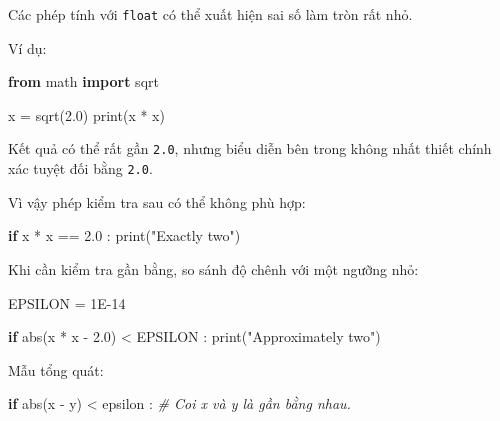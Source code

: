 \documentclass[
  11pt,
  a4paper,
]{article}
\newenvironment{Shaded}{}{}
\newcommand{\BuiltInTok}[1]{\textcolor[rgb]{0.00,0.50,0.00}{#1}}
\newcommand{\CommentTok}[1]{\textcolor[rgb]{0.38,0.63,0.69}{\textit{#1}}}
\newcommand{\ControlFlowTok}[1]{\textcolor[rgb]{0.00,0.44,0.13}{\textbf{#1}}}
\newcommand{\FloatTok}[1]{\textcolor[rgb]{0.25,0.63,0.44}{#1}}
\newcommand{\ImportTok}[1]{\textcolor[rgb]{0.00,0.50,0.00}{\textbf{#1}}}
\newcommand{\NormalTok}[1]{#1}
\newcommand{\OperatorTok}[1]{\textcolor[rgb]{0.40,0.40,0.40}{#1}}
\newcommand{\StringTok}[1]{\textcolor[rgb]{0.25,0.44,0.63}{#1}}
\begin{document}
Các phép tính với \texttt{float} có thể xuất hiện sai số làm tròn rất
nhỏ.

Ví dụ:

\begin{Shaded}
\begin{Highlighting}[]
\ImportTok{from}\NormalTok{ math }\ImportTok{import}\NormalTok{ sqrt}

\NormalTok{x }\OperatorTok{=}\NormalTok{ sqrt(}\FloatTok{2.0}\NormalTok{)}
\BuiltInTok{print}\NormalTok{(x }\OperatorTok{*}\NormalTok{ x)}
\end{Highlighting}
\end{Shaded}

Kết quả có thể rất gần \texttt{2.0}, nhưng biểu diễn bên trong không
nhất thiết chính xác tuyệt đối bằng \texttt{2.0}.

Vì vậy phép kiểm tra sau có thể không phù hợp:

\begin{Shaded}
\begin{Highlighting}[]
\ControlFlowTok{if}\NormalTok{ x }\OperatorTok{*}\NormalTok{ x }\OperatorTok{==} \FloatTok{2.0}\NormalTok{ :}
    \BuiltInTok{print}\NormalTok{(}\StringTok{"Exactly two"}\NormalTok{)}
\end{Highlighting}
\end{Shaded}

Khi cần kiểm tra gần bằng, so sánh độ chênh với một ngưỡng nhỏ:

\begin{Shaded}
\begin{Highlighting}[]
\NormalTok{EPSILON }\OperatorTok{=} \FloatTok{1E{-}14}

\ControlFlowTok{if} \BuiltInTok{abs}\NormalTok{(x }\OperatorTok{*}\NormalTok{ x }\OperatorTok{{-}} \FloatTok{2.0}\NormalTok{) }\OperatorTok{\textless{}}\NormalTok{ EPSILON :}
    \BuiltInTok{print}\NormalTok{(}\StringTok{"Approximately two"}\NormalTok{)}
\end{Highlighting}
\end{Shaded}

Mẫu tổng quát:

\begin{Shaded}
\begin{Highlighting}[]
\ControlFlowTok{if} \BuiltInTok{abs}\NormalTok{(x }\OperatorTok{{-}}\NormalTok{ y) }\OperatorTok{\textless{}}\NormalTok{ epsilon :}
    \CommentTok{\# Coi x và y là gần bằng nhau.}
\end{Highlighting}
\end{Shaded}
\end{document}

